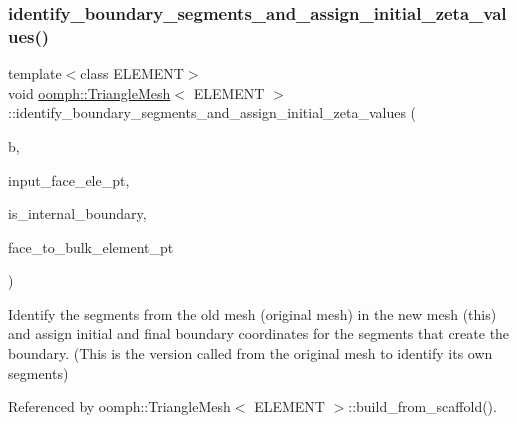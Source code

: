 \subsubsection{\texorpdfstring{identify\+\_\+boundary\+\_\+segments\+\_\+and\+\_\+assign\+\_\+initial\+\_\+zeta\+\_\+values()}{identify\_boundary\_segments\_and\_assign\_initial\_zeta\_values()}\hspace{0.1cm}{\footnotesize\ttfamily [1/2]}}
{\footnotesize\ttfamily template$<$class E\+L\+E\+M\+E\+NT$>$ \\
void \hyperlink{classoomph_1_1TriangleMesh}{oomph\+::\+Triangle\+Mesh}$<$ E\+L\+E\+M\+E\+NT $>$\+::identify\+\_\+boundary\+\_\+segments\+\_\+and\+\_\+assign\+\_\+initial\+\_\+zeta\+\_\+values (\begin{DoxyParamCaption}\item[{const unsigned \&}]{b,  }\item[{Vector$<$ Finite\+Element $\ast$$>$ \&}]{input\+\_\+face\+\_\+ele\+\_\+pt,  }\item[{const bool \&}]{is\+\_\+internal\+\_\+boundary,  }\item[{std\+::map$<$ Finite\+Element $\ast$, Finite\+Element $\ast$$>$ \&}]{face\+\_\+to\+\_\+bulk\+\_\+element\+\_\+pt }\end{DoxyParamCaption})}



Identify the segments from the old mesh (original mesh) in the new mesh (this) and assign initial and final boundary coordinates for the segments that create the boundary. (This is the version called from the original mesh to identify its own segments) 



Referenced by oomph\+::\+Triangle\+Mesh$<$ E\+L\+E\+M\+E\+N\+T $>$\+::build\+\_\+from\+\_\+scaffold().

\mbox{\label{classoomph_1_1TriangleMesh_ad79adab8a5da9c9fff26bfeeb019f102}} 

